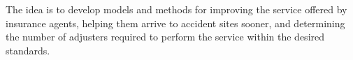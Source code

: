 The idea is to develop models and methods
for improving the service offered by insurance agents,
helping them arrive to accident sites sooner,
and determining the number of adjusters required
to perform the service within the desired standards.
